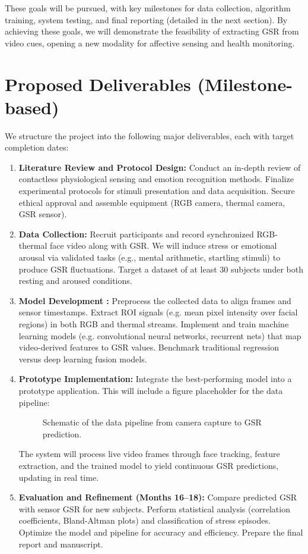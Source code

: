 \documentclass[12pt]{article}
\begin{document}
    These goals will be pursued, with key milestones for data collection, algorithm training, system testing, and final reporting (detailed in the next section). By achieving these goals, we will demonstrate the feasibility of extracting GSR from video cues, opening a new modality for affective sensing and health monitoring.


    \section{Proposed Deliverables (Milestone-based)}
    We structure the project into the following major deliverables, each with target completion dates:
    \begin{enumerate}
        \item \textbf{Literature Review and Protocol Design:} Conduct an in-depth review of contactless physiological sensing and emotion recognition methods. Finalize experimental protocols for stimuli presentation and data acquisition. Secure ethical approval and assemble equipment (RGB camera, thermal camera, GSR sensor).
        \item \textbf{Data Collection:} Recruit participants and record synchronized RGB-thermal face video along with GSR. We will induce stress or emotional arousal via validated tasks (e.g., mental arithmetic, startling stimuli) to produce GSR fluctuations. Target a dataset of at least 30 subjects under both resting and aroused conditions.
        \item \textbf{Model Development :} Preprocess the collected data to align frames and sensor timestamps. Extract ROI signals (e.g. mean pixel intensity over facial regions) in both RGB and thermal streams. Implement and train machine learning models (e.g. convolutional neural networks, recurrent nets) that map video-derived features to GSR values. Benchmark traditional regression versus deep learning fusion models.
        \item \textbf{Prototype Implementation:} Integrate the best-performing model into a prototype application. This will include a figure placeholder for the data pipeline:
        \begin{figure}[ht]
            \centering
            \caption{Schematic of the data pipeline from camera capture to GSR prediction.}
            \label{fig:pipeline}
        \end{figure}
        The system will process live video frames through face tracking, feature extraction, and the trained model to yield continuous GSR predictions, updating in real time.
        \item \textbf{Evaluation and Refinement (Months 16--18):} Compare predicted GSR with sensor GSR for new subjects. Perform statistical analysis (correlation coefficients, Bland-Altman plots) and classification of stress episodes. Optimize the model and pipeline for accuracy and efficiency. Prepare the final report and manuscript.
    \end{enumerate}
\end{document}
